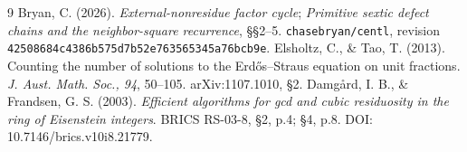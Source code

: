 \documentclass[11pt,reqno]{amsart}
\begin{document}
\begin{thebibliography}{9}
 Bryan, C. (2026). \emph{External-nonresidue factor cycle};
\emph{Primitive sextic defect chains and the neighbor-square recurrence}, \S\S2--5.
\texttt{chasebryan/centl}, revision \texttt{42508684c4386b575d7b52e763565345a76bcb9e}.
 Elsholtz, C., \& Tao, T. (2013). Counting the number of solutions to
the Erd\H{o}s--Straus equation on unit fractions. \emph{J. Aust. Math. Soc., 94},
50--105. arXiv:1107.1010, \S2.
 Damg\aa rd, I. B., \& Frandsen, G. S. (2003).
\emph{Efficient algorithms for gcd and cubic residuosity in the ring of Eisenstein integers}.
BRICS RS-03-8, \S2, p.4; \S4, p.8. DOI: 10.7146/brics.v10i8.21779.
\end{thebibliography}
\end{document}
